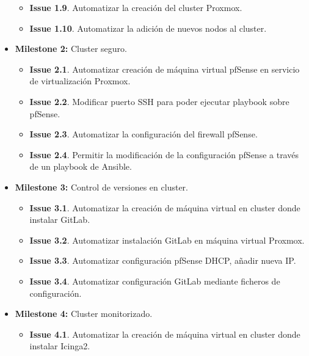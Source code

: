 \begin{text}
\begin{itemize}
\begin{itemize}
                                        \item \textbf{Issue 1.9}. Automatizar la creación del cluster Proxmox.
                                        \item \textbf{Issue 1.10}. Automatizar la adición de nuevos nodos al cluster.
                                \end{itemize}
                        \item \textbf{Milestone 2:} Cluster seguro.
                                \begin{itemize}
                                        \item \textbf{Issue 2.1}. Automatizar creación de máquina virtual pfSense en servicio de virtualización Proxmox.
                                        \item \textbf{Issue 2.2}. Modificar puerto SSH para poder ejecutar playbook sobre pfSense.
                                        \item \textbf{Issue 2.3}. Automatizar la configuración del firewall pfSense.
                                        \item \textbf{Issue 2.4}. Permitir la modificación de la configuración pfSense a través de un playbook de Ansible.
                                \end{itemize}
                        \item \textbf{Milestone 3:} Control de versiones en cluster.
                                \begin{itemize}
                                        \item \textbf{Issue 3.1}. Automatizar la creación de máquina virtual en cluster donde instalar GitLab.
                                        \item \textbf{Issue 3.2}. Automatizar instalación GitLab en máquina virtual Proxmox.
                                        \item \textbf{Issue 3.3}. Automatizar configuración pfSense DHCP, añadir nueva IP.
                                        \item \textbf{Issue 3.4}. Automatizar configuración GitLab mediante ficheros de configuración.
                                \end{itemize}
                        \item \textbf{Milestone 4:} Cluster monitorizado.
                                \begin{itemize}
                                        \item \textbf{Issue 4.1}. Automatizar la creación de máquina virtual en cluster donde instalar Icinga2.

\end{itemize}
\end{itemize}
\end{text}
